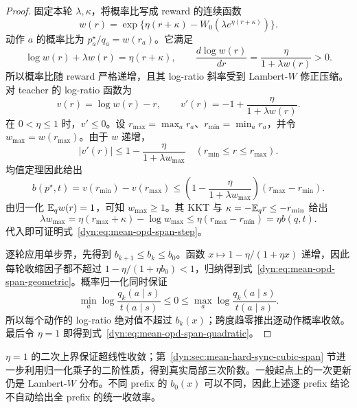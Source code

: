 \begin{proof}
固定本轮 $\lambda,\kappa$，将概率比写成 reward 的连续函数
\begin{equation*}
 w(r)=\exp\{\eta(r+\kappa)-W_0(\lambda e^{\eta(r+\kappa)})\}.
\end{equation*}
动作 $a$ 的概率比为 $p_a^\star/q_a=w(r_a)$。它满足
\begin{equation*}
 \log w(r)+\lambda w(r)=\eta(r+\kappa),
 \qquad
 \frac{d\log w(r)}{dr}=\frac{\eta}{1+\lambda w(r)}>0.
\end{equation*}
所以概率比随 reward 严格递增，且其 log-ratio 斜率受到 Lambert-$W$ 修正压缩。对 teacher 的 log-ratio 函数为
\begin{equation*}
 v(r)=\log w(r)-r,
 \qquad v'(r)=-1+\frac{\eta}{1+\lambda w(r)}.
\end{equation*}
在 $0<\eta\le1$ 时，$v'\le0$。设 $r_{\max}=\max_a r_a$、$r_{\min}=\min_a r_a$，并令 $w_{\max}=w(r_{\max})$。由于 $w$ 递增，
\begin{equation*}
 |v'(r)|\le1-\frac{\eta}{1+\lambda w_{\max}}
 \quad (r_{\min}\le r\le r_{\max}).
\end{equation*}
均值定理因此给出
\begin{equation*}
 b(p^\star,t)=v(r_{\min})-v(r_{\max})
 \le\left(1-\frac{\eta}{1+\lambda w_{\max}}\right)
       (r_{\max}-r_{\min}).
\end{equation*}
由归一化 $\mathbb E_qw(r)=1$，可知 $w_{\max}\ge1$。其 KKT 与 $\kappa=-\mathbb E_qr\le-r_{\min}$ 给出
\begin{equation*}
 \lambda w_{\max}
 =\eta(r_{\max}+\kappa)-\log w_{\max}
 \le\eta(r_{\max}-r_{\min})=\eta b(q,t).
\end{equation*}
代入即可证明式~\eqref{dyn:eq:mean-opd-span-step}。

逐轮应用单步界，先得到 $b_{k+1}\le b_k\le b_0$。函数 $x\mapsto1-\eta/(1+\eta x)$ 递增，因此每轮收缩因子都不超过 $1-\eta/(1+\eta b_0)<1$，归纳得到式~\eqref{dyn:eq:mean-opd-span-geometric}。概率归一化同时保证
\begin{equation*}
 \min_a\log\frac{q_k(a\mid s)}{t(a\mid s)}
 \le0\le
 \max_a\log\frac{q_k(a\mid s)}{t(a\mid s)}.
\end{equation*}
所以每个动作的 log-ratio 绝对值不超过 $b_k(x)$；跨度趋零推出逐动作概率收敛。最后令 $\eta=1$ 即得到式~\eqref{dyn:eq:mean-opd-span-quadratic}。
\end{proof}

$\eta=1$ 的二次上界保证超线性收敛；第~\ref{dyn:sec:mean-hard-sync-cubic-span} 节进一步利用归一化乘子的二阶性质，得到真实局部三次阶数。一般起点上的一次更新仍是 Lambert-$W$ 分布。不同 prefix 的 $b_0(x)$ 可以不同，因此上述逐 prefix 结论不自动给出全 prefix 的统一收敛率。

